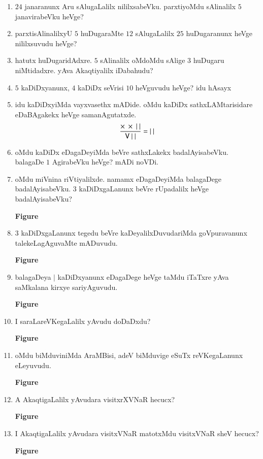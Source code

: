 \begin{enumerate}
\item $24$ janaranunx Aru sAlugaLalilx nililxsabeVku. parxtiyoMdu sAlinalilx $5$ janavirabeVku heVge?

\item parxtisAlinalilxyU $5$ huDugaraMte $12$ sAlugaLalilx $25$ huDugaranunx heVge nililxsuvudu heVge?

\item hatutx huDugaridAdxre. $5$ sAlinalilx oMdoMdu sAlige $3$ huDugaru niMtidadxre. yAva Akaqtiyalilx iDabahudu?

\item $5$ kaDiDxyanunx, $4$ kaDiDx seVrisi $10$ heVguvudu heVge? idu hAsayx

\item idu kaDiDxyiMda vayxvasethx mADide. oMdu kaDiDx sathxLAMtarisidare eDaBAgakekx heVge samanAgutatxde.
$$
\frac{\times \ \times \ |~|}{{\sf V}~|~|}=|~|
$$

\item oMdu kaDiDx eDagaDeyiMda beVre sathxLakekx badalAyisabeVku. balagaDe $1$ AgirabeVku heVge? mADi noVDi.


\item oMdu miVnina riVtiyalilxde. namamx eDagaDeyiMda balagaDege badalAyisabeVku. $3$ kaDiDxgaLanunx beVre rUpadalilx heVge badalAyisabeVku?
\begin{center}
{\rm\bfseries Figure}
\end{center}

\item $3$ kaDiDxgaLanunx tegedu beVre kaDeyalilxDuvudariMda goVpuravanunx talekeLagAguvaMte mADuvudu.
\begin{center}
{\rm\bfseries Figure}
\end{center}

\item balagaDeya $|$ kaDiDxyanunx eDagaDege heVge taMdu iTaTxre yAva saMkalana kirxye sariyAguvudu.
\begin{center}
{\rm\bfseries Figure}
\end{center}

\item I saraLareVKegaLalilx yAvudu doDaDxdu?
\begin{center}
{\rm\bfseries Figure}
\end{center}

\item oMdu biMduviniMda AraMBisi, adeV biMduvige eSuTx reVKegaLanunx eLeyuvudu.
\begin{center}
{\rm\bfseries Figure}
\end{center}

\item A AkaqtigaLalilx yAvudara visitxrXVNaR hecucx?
\begin{center}
{\rm\bfseries Figure}
\end{center}

\item I AkaqtigaLalilx yAvudara visitxVNaR matotxMdu visitxVNaR sheV hecucx?
\begin{center}
{\rm\bfseries Figure}
\end{center}

\end{enumerate}
